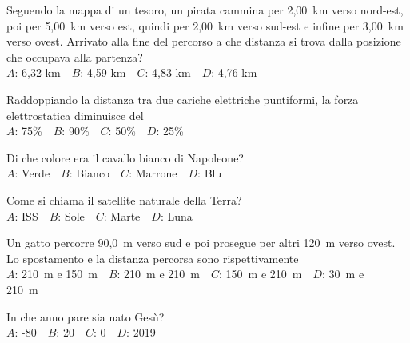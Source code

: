\mcquestionfooter



\def\mcquestionnumber{4}


\mcquestionheader Seguendo la mappa di un tesoro, un pirata cammina per 2,00~km verso nord-est, poi per 5,00~km verso est, quindi per 2,00~km verso sud-est e infine per 3,00~km verso ovest. Arrivato alla fine del percorso a che distanza si trova dalla posizione che occupava alla partenza?\\
{$A$}: 6,32 km\ \ {$B$}: 4,59 km\ \ {$C$}: 4,83 km\ \ {$D$}: 4,76 km\ \ 

\mcquestionfooter



\def\mcquestionnumber{5}


\mcquestionheader Raddoppiando la distanza tra due cariche elettriche puntiformi, la forza elettrostatica diminuisce del\\
{$A$}: 75\%\ \ {$B$}: 90\%\ \ {$C$}: 50\%\ \ {$D$}: 25\%\ \ 

\mcquestionfooter



\def\mcquestionnumber{6}


\mcquestionheader Di che colore era il cavallo bianco di Napoleone?\\
{$A$}: Verde\ \ {$B$}: Bianco\ \ {$C$}: Marrone\ \ {$D$}: Blu\ \ 

\mcquestionfooter



\def\mcquestionnumber{7}


\mcquestionheader Come si chiama il satellite naturale della Terra?\\
{$A$}: ISS\ \ {$B$}: Sole\ \ {$C$}: Marte\ \ {$D$}: Luna\ \ 

\mcquestionfooter



\def\mcquestionnumber{8}


\mcquestionheader Un gatto percorre 90,0~m verso sud e poi prosegue per altri 120~m verso ovest. Lo spostamento e la distanza percorsa sono rispettivamente\\
{$A$}: 210~m e 150~m\ \ {$B$}: 210~m e 210~m\ \ {$C$}: 150~m e 210~m\ \ {$D$}: 30~m e 210~m\ \ 

\mcquestionfooter



\def\mcquestionnumber{9}


\mcquestionheader In che anno pare sia nato Gesù?\\
{$A$}: -80\ \ {$B$}: 20\ \ {$C$}: 0\ \ {$D$}: 2019\ \ 

